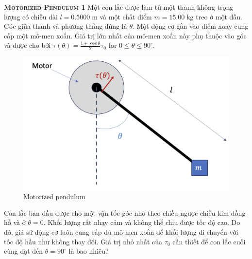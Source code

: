 \begin{problem}
\textbf{\textsc{Motorized Pendulum 1}}
Một con lắc được làm từ một thanh không trọng lượng có chiều dài $l=0.5000\;\mathrm{m}$ và một chất điểm $m=15.00\;\mathrm{kg}$ treo ở một đầu. Góc giữa thanh và phương thẳng đứng là $\theta$. Một động cơ gắn vào điểm xoay cung cấp một mô-men xoắn. Giá trị lớn nhất của mô-men xoắn này phụ thuộc vào góc và được cho bởi $\tau (\theta)=\frac{1+\cos\theta}{2} \tau_0$ for $0\leq \theta \leq 90^{\circ}$.

\begin{figure}[h]
    \centering
    \includegraphics[width=0.5\linewidth]{problems/figures/mot_pend.png}
    \caption{Motorized pendulum}
    \label{fig:enter-label}
\end{figure}

Con lắc ban đầu được cho một vận tốc góc nhỏ theo chiều ngược chiều kim đồng hồ và ở $\theta = 0$. Khối lượng rất nhạy cảm và không thể chịu được tốc độ cao. Do đó, giả sử động cơ luôn cung cấp đủ mô-men xoắn để khối lượng di chuyển với tốc độ hầu như không thay đổi. Giá trị nhỏ nhất của $\tau_0$ cần thiết để con lắc cuối cùng đạt đến $\theta=90^{\circ}$ là bao nhiêu?


\end{problem}
